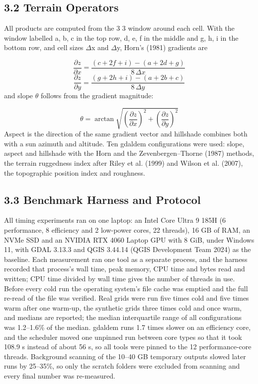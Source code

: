 \documentclass[10pt,a4paper]{article}
\begin{document}
\subsection*{3.2 Terrain Operators}
All products are computed from the 3 \texttimes{} 3 window around each cell. With the window labelled a, b, c in the top row, d, e, f in the middle and g, h, i in the bottom row, and cell sizes $\Delta$x and $\Delta$y, Horn's (1981) gradients are

\begin{equation}\frac{\partial z}{\partial x}=\frac{(c+2f+i)-(a+2d+g)}{8\,\Delta x}\end{equation}
\begin{equation}\frac{\partial z}{\partial y}=\frac{(g+2h+i)-(a+2b+c)}{8\,\Delta y}\end{equation}
and slope $\theta$ follows from the gradient magnitude:

\begin{equation}\theta=\arctan\sqrt{\left(\frac{\partial z}{\partial x}\right)^{2}+\left(\frac{\partial z}{\partial y}\right)^{2}}\end{equation}
Aspect is the direction of the same gradient vector and hillshade combines both with a sun azimuth and altitude. Ten gdaldem configurations were used: slope, aspect and hillshade with the Horn and the Zevenbergen--Thorne (1987) methods, the terrain ruggedness index after Riley et al. (1999) and Wilson et al. (2007), the topographic position index and roughness.

\subsection*{3.3 Benchmark Harness and Protocol}
All timing experiments ran on one laptop: an Intel Core Ultra 9 185H (6 performance, 8 efficiency and 2 low-power cores, 22 threads), 16 GB of RAM, an NVMe SSD and an NVIDIA RTX 4060 Laptop GPU with 8 GiB, under Windows 11, with GDAL 3.13.3 and QGIS 3.44.14 (QGIS Development Team 2024) as the baseline. Each measurement ran one tool as a separate process, and the harness recorded that process's wall time, peak memory, CPU time and bytes read and written; CPU time divided by wall time gives the number of threads in use. Before every cold run the operating system's file cache was emptied and the full re-read of the file was verified. Real grids were run five times cold and five times warm after one warm-up, the synthetic grids three times cold and once warm, and medians are reported; the median interquartile range of all configurations was 1.2--1.6\% of the median. gdaldem runs 1.7 times slower on an efficiency core, and the scheduler moved one unpinned run between core types so that it took 108.9 s instead of about 56 s, so all tools were pinned to the 12 performance-core threads. Background scanning of the 10--40 GB temporary outputs slowed later runs by 25--35\%, so only the scratch folders were excluded from scanning and every final number was re-measured.
\end{document}
